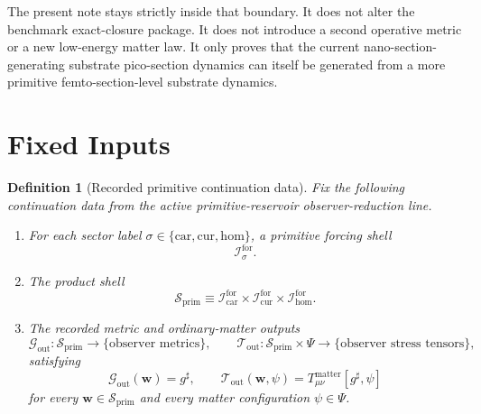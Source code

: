 \documentclass[11pt]{article}
\newcommand{\CompletedMetric}{g^{\sharp}}
\newcommand{\MatterSpace}{\Psi}
\newcommand{\Car}{\mathrm{car}}
\newcommand{\Cur}{\mathrm{cur}}
\newcommand{\Hom}{\mathrm{hom}}
\newcommand{\ForSpace}[1]{\mathcal I_{#1}^{\mathrm{for}}}
\newcommand{\PrimShell}{\mathcal S_{\mathrm{prim}}}
\newcommand{\MetricOut}{\mathscr G_{\mathrm{out}}}
\newcommand{\MatterOut}{\mathscr T_{\mathrm{out}}}
\newtheorem{definition}{Definition}
\begin{document}
The present note stays strictly inside that boundary. It does not alter the benchmark exact-closure package. It does not introduce a second operative metric or a new low-energy matter law. It only proves that the current nano-section-generating substrate pico-section dynamics can itself be generated from a more primitive femto-section-level substrate dynamics.

\section{Fixed Inputs}

\begin{definition}[Recorded primitive continuation data]
\label{def:fixed}
Fix the following continuation data from the active primitive-reservoir observer-reduction line.
\begin{enumerate}
    \item For each sector label \(\sigma\in\{\Car,\Cur,\Hom\}\), a primitive forcing shell
    \[
    \ForSpace{\sigma}.
    \]
    \item The product shell
    \[
    \PrimShell
    \equiv
    \ForSpace{\Car}\times \ForSpace{\Cur}\times \ForSpace{\Hom}.
    \]
    \item The recorded metric and ordinary-matter outputs
    \[
    \MetricOut:\PrimShell\to\{\text{observer metrics}\},
    \qquad
    \MatterOut:\PrimShell\times\MatterSpace\to\{\text{observer stress tensors}\},
    \]
    satisfying
    \begin{equation}
    \MetricOut(\mathbf w)=\CompletedMetric,
    \qquad
    \MatterOut(\mathbf w,\psi)
    =
    T_{\mu\nu}^{\mathrm{matter}}[\CompletedMetric,\psi]
    \label{eq:fixedoutputs}
    \end{equation}
    for every \(\mathbf w\in\PrimShell\) and every matter configuration \(\psi\in\MatterSpace\).
\end{enumerate}
\end{definition}
\end{document}
